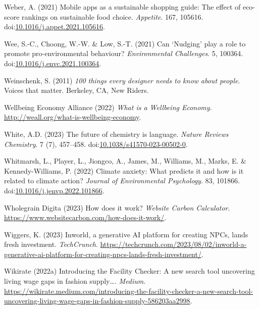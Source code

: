 \documentclass[
  letterpaper,
  DIV=11,
  numbers=noendperiod]{scrartcl}
\newlength{\cslhangindent}
\newenvironment{CSLReferences}[2] %
 {\begin{list}{}{%
  \setlength{\itemindent}{0pt}
  \setlength{\leftmargin}{0pt}
  \setlength{\parsep}{0pt}
  \ifodd #1
   \setlength{\leftmargin}{\cslhangindent}
   \setlength{\itemindent}{-1\cslhangindent}
  \fi
  \setlength{\itemsep}{#2\baselineskip}}}
 {\end{list}}
\begin{document}
\begin{CSLReferences}{0}{1}
Weber, A. (2021) Mobile apps as a sustainable shopping guide: {The}
effect of eco-score rankings on sustainable food choice.
\emph{Appetite}. 167, 105616.
doi:\href{https://doi.org/10.1016/j.appet.2021.105616}{10.1016/j.appet.2021.105616}.

Wee, S.-C., Choong, W.-W. \& Low, S.-T. (2021) Can {`{Nudging}'} play a
role to promote pro-environmental behaviour? \emph{Environmental
Challenges}. 5, 100364.
doi:\href{https://doi.org/10.1016/j.envc.2021.100364}{10.1016/j.envc.2021.100364}.

Weinschenk, S. (2011) \emph{100 things every designer needs to know
about people}. Voices that matter. Berkeley, CA, New Riders.

Wellbeing Economy Alliance (2022) \emph{What is a {Wellbeing Economy}}.
\url{http://weall.org/what-is-wellbeing-economy}.

White, A.D. (2023) The future of chemistry is language. \emph{Nature
Reviews Chemistry}. 7 (7), 457--458.
doi:\href{https://doi.org/10.1038/s41570-023-00502-0}{10.1038/s41570-023-00502-0}.

Whitmarsh, L., Player, L., Jiongco, A., James, M., Williams, M., Marks,
E. \& Kennedy-Williams, P. (2022) Climate anxiety: {What} predicts it
and how is it related to climate action? \emph{Journal of Environmental
Psychology}. 83, 101866.
doi:\href{https://doi.org/10.1016/j.jenvp.2022.101866}{10.1016/j.jenvp.2022.101866}.

Wholegrain Digita (2023) How does it work? \emph{Website Carbon
Calculator}. \url{https://www.websitecarbon.com/how-does-it-work/}.

Wiggers, K. (2023) Inworld, a generative {AI} platform for creating
{NPCs}, lands fresh investment. \emph{TechCrunch}.
\url{https://techcrunch.com/2023/08/02/inworld-a-generative-ai-platform-for-creating-npcs-lands-fresh-investment/}.

Wikirate (2022a) Introducing the {Facility Checker}: {A} new search tool
uncovering living wage gaps in fashion supply{\ldots{}}. \emph{Medium}.
\url{https://wikirate.medium.com/introducing-the-facility-checker-a-new-search-tool-uncovering-living-wage-gaps-in-fashion-supply-586203aa2998}.


\end{CSLReferences}
\end{document}
